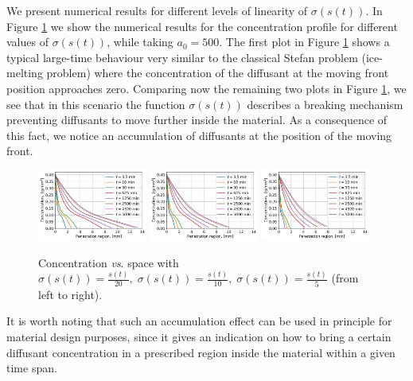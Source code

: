 \documentclass{article}
\begin{document}
 We present numerical results for  different levels of linearity  of $\sigma(s(t))$.
 In Figure \ref{Fig:4} we  show the numerical results for the concentration profile for different values of $\sigma(s(t))$, while taking $a_0 = 500$. The first plot in Figure \ref{Fig:4}  shows a typical large-time behaviour very similar to the classical Stefan problem (ice-melting problem) where the concentration of the diffusant at the moving front position approaches zero.
Comparing now the remaining two plots in  Figure \ref{Fig:4}, we see that in this scenario the function $\sigma(s(t))$ describes a breaking mechanism preventing diffusants to move further inside the material. As a consequence of this fact, we notice an accumulation of diffusants at the position of the moving front.

\begin{figure}[h!]
	\centering
	\includegraphics[width=0.32\textwidth]{Rubber_Large_Con_Sigma_0005.png}
	\hspace{0.1mm}
	\includegraphics[width=0.32\textwidth]{Rubber_Large_Con_Sigma_001.png}
	\hspace{0.1cm}
	\includegraphics[width=0.32\textwidth]{Rubber_Large_Con_Sigma_002.png}
	\caption{Concentration \textit{vs}. space with $\sigma(s(t)) =  \frac{s(t)}{20},\; \sigma(s(t)) = \frac{s(t)}{10}, \;\sigma(s(t)) = \frac{s(t)}{5}$ (from left to right).}
	\label{Fig:4}
\end{figure}
It is worth noting that such an accumulation effect can be used in principle for material design purposes, since it gives an indication on how to bring a certain diffusant concentration in a prescribed region inside the material within a given time span. 
\end{document}
